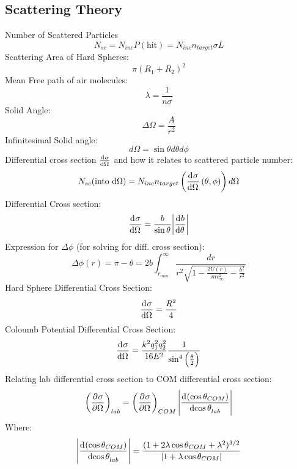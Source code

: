 \subsection{Scattering Theory}
Number of Scattered Particles
\begin{equation}
    N_{sc} = N_{inc}P(\text{hit}) = N_{inc}n_{target}\sigma L
\end{equation}
Scattering Area of Hard Spheres:
\begin{equation}
    \pi(R_1 + R_2)^2
\end{equation}
Mean Free path of air molecules:
\begin{equation}
    \lambda = \frac{1}{n\sigma}
\end{equation}
Solid Angle:
\begin{equation}
    \Delta \Omega = \frac{A}{r^2}
\end{equation}
Infinitesimal Solid angle:
\begin{equation}
    d\Omega = \sin\theta d\theta d\phi
\end{equation}
Differential cross section $\od{\sigma}{\Omega}$ and how it relates to scattered particle number:
\begin{equation}
    N_{sc}(\text{into d$\Omega$}) = N_{inc}n_{target}\left(\dod{\sigma}{\Omega}(\theta, \phi)\right)d\Omega
\end{equation}
Differential Cross section:
\begin{equation}
    \dod{\sigma}{\Omega} = \frac{b}{\sin\theta}\abs{\dod{b}{\theta}}
\end{equation}
Expression for $\Delta \phi$ (for solving for diff. cross section):
\begin{equation}
    \Delta \phi(r) = \pi - \theta =  2b\int_{r_{min}}^\infty \frac{dr}{r^2\sqrt{1 - \frac{2U(r)}{mv^2_\infty} - \frac{b^2}{r^2}}}
\end{equation}
Hard Sphere Differential Cross Section:
\begin{equation}
    \dod{\sigma}{\Omega} = \frac{R^2}{4}
\end{equation}
Coloumb Potential Differential Cross Section:
\begin{equation}
    \dod{\sigma}{\Omega} = \frac{k^2q_1^2q_2^2}{16E^2}\frac{1}{\sin^4\left(\frac{\theta}{2}\right)}
\end{equation}
Relating lab differential cross section to COM differential cross section:
\begin{equation}
    \left(\dpd{\sigma}{\Omega}\right)_{lab} = \left(\dpd{\sigma}{\Omega}\right)_{COM}\abs{\dod{(\cos\theta_{COM})}{\cos\theta_{lab}}}
\end{equation}
Where:
\begin{equation}
    \abs{\dod{(\cos\theta_{COM})}{\cos\theta_{lab}}} = \frac{(1 + 2\lambda \cos\theta_{COM} + \lambda^2)^{3/2}}{\abs{1 + \lambda \cos\theta_{COM}}}
\end{equation}

